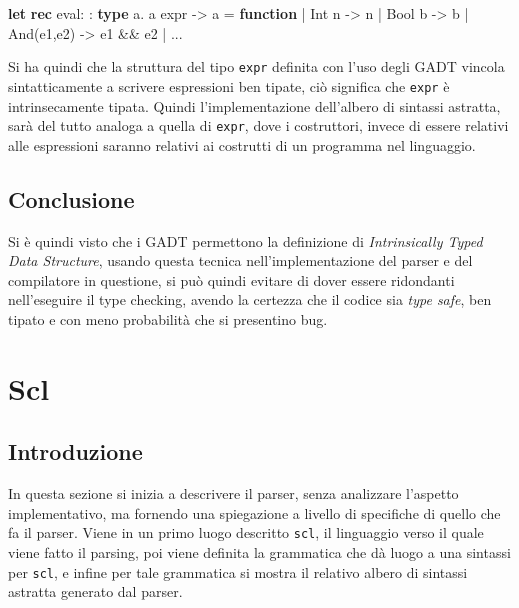 \documentclass[]{article}
\newenvironment{Shaded}{}{}
\newcommand{\KeywordTok}[1]{\textcolor[rgb]{0.00,0.44,0.13}{\textbf{#1}}}
\newcommand{\NormalTok}[1]{#1}
\begin{document}
\begin{Shaded}
\begin{Highlighting}[]
\KeywordTok{let} \KeywordTok{rec}\NormalTok{ eval: : }\KeywordTok{type}\NormalTok{ a. a expr -> a =}
\KeywordTok{function}
\NormalTok{ | Int n -> n}
\NormalTok{ | Bool b -> b}
\NormalTok{ | And(e1,e2) -> e1 && e2}
\NormalTok{ | ... }
\end{Highlighting}
\end{Shaded}

Si ha quindi che la struttura del tipo \texttt{expr} definita con l'uso
degli GADT vincola sintatticamente a scrivere espressioni ben tipate,
ciò significa che \texttt{expr} è intrinsecamente tipata. Quindi
l'implementazione dell'albero di sintassi astratta, sarà del tutto
analoga a quella di \texttt{expr}, dove i costruttori, invece di essere
relativi alle espressioni saranno relativi ai costrutti di un programma
nel linguaggio.

\hypertarget{conclusione}{%
\subsection{Conclusione}\label{conclusione}}

Si è quindi visto che i GADT permettono la definizione di
\emph{Intrinsically Typed Data Structure}, usando questa tecnica
nell'implementazione del parser e del compilatore in questione, si può
quindi evitare di dover essere ridondanti nell'eseguire il type
checking, avendo la certezza che il codice sia \emph{type safe}, ben
tipato e con meno probabilità che si presentino bug.

\hypertarget{scl}{%
\section{Scl}\label{scl}}

\hypertarget{introduzione-2}{%
\subsection{Introduzione}\label{introduzione-2}}

In questa sezione si inizia a descrivere il parser, senza analizzare
l'aspetto implementativo, ma fornendo una spiegazione a livello di
specifiche di quello che fa il parser. Viene in un primo luogo descritto
\texttt{scl}, il linguaggio verso il quale viene fatto il parsing, poi
viene definita la grammatica che dà luogo a una sintassi per
\texttt{scl}, e infine per tale grammatica si mostra il relativo albero
di sintassi astratta generato dal parser.
\end{document}
